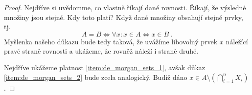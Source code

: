 \begin{proof}
    Nejdříve si uvědomme, co vlastně říkají dané rovnosti. Říkají, že výsledné množiny jsou stejné. Kdy toto platí? Když dané množiny obsahují stejné prvky, tj.
    \begin{equation*}
        A=B \iff \forall x : x\in A \iff x\in B\; .     
    \end{equation*}
    Myšlenka našeho důkazu bude tedy taková, že uvážíme libovolný prvek $x$ náležící pravé straně rovnosti a ukážeme, že rovněž náleží i straně druhé.\par
    Nejdříve ukážeme platnost \ref{item:de_morgan_sets_1}, avšak důkaz \ref{item:de_morgan_sets_2} bude zcela analogický. Budiž dáno $x\in A \setminus \left(\bigcap_{i=1}^{n}{X_i}\right)$.
\end{proof}

